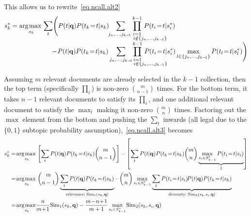 \documentclass[a4paper]{article}
\renewcommand{\vec}[1]{\mathbf{#1}}
\newcommand{\Sim}{\mathrm{Sim}}
\def\argmax{\operatornamewithlimits{\!arg \;\! max\,}}
\begin{document}
This allows us to rewrite~\eqref{eq.ncall.alt2}
\begin{align}
 & s_k^* = \, \argmax_{s_k} \sum_t \Biggl( P(t|\vec{q}) P(t_k\!=\!t|s_k)  \sum_{\hspace{-1mm} j_n, \dots, j_{k-\!1}} \hspace{-13.5mm} \prod_{\substack{i=1 \\ \hspace{14mm} i \notin \{j_n, \dots, j_{k-\!1}\}}}^{k-1} \hspace{-13mm} P(t_i\!=\!t|s_i^*) \nonumber \\[-1.5mm]
 & \hspace{25mm} - \!P(t|\vec{q}) P(t_k\!=\!t|s_k) \sum_{j_n, \dots, j_{k-\!1}} \hspace{-14mm} \prod_{\substack{i=1 \\ \hspace{14mm} i \notin \{j_n, \dots, j_{k-\!1}\}}}^{k-1} \hspace{-13mm} P(t_i\!=\!t|s_i^*) \max_{l \in \{j_n, \dots, j_{k-\!1}\}} P(t_l\!=\!t|s_l^*) \Biggr) \label{eq.ncall.alt3}
\end{align}

Assuming $m$ relevant documents are already selected in the $k-1$ collection, then the top term (specifically $\prod_i$) is non-zero $\binom{m}{n-1}$ times.  For the
bottom term, it takes $n-1$ relevant documents to satisfy its
$\prod_i$, and one additional relevant document to satisfy the
$\max_l$ making it non-zero $\binom{m}{n}$ times.  Factoring out the
$\max$ element from the bottom and pushing the $\sum_t$ inwards (all legal
due to the $\{0,1\}$ subtopic probability assumption),~\eqref{eq.ncall.alt3} becomes
\begin{align}
 s_k^* & = \argmax_{s_k} \left[ \sum_t P(t|\vec{q}) P(t_k\!=\!t|s_k) \binom{m}{n-1} \right]
 - \left[ \sum_t P(t|\vec{q}) P(t_k\!=\!t|s_k) \binom{m}{n} \underbrace{\max_{s_i \in S_{k-1}^*} P(t_i\!=\!t|s_i)}_{1} \right] \nonumber\\
 & = \argmax_{s_k} \binom{m}{n-1} \underbrace{\sum_t P(t|\vec{q}) P(t_k\!=\!t|s_k)}_{\textrm{relevance}: \; \Sim_1(s_k,\vec{q})}
 - \binom{m}{n} \max_{s_i \in S_{k-1}^*} \underbrace{\sum_t P(t_i\!=\!t|s_i) \!P(t|\vec{q}) P(t_k\!=\!t|s_k)}_{\textrm{diversity}: \; \Sim_2(s_k,s_i,\vec{q})} \label{note9}\\
 & = \argmax_{s_k} \!\! \frac{n}{m\!+\!1} \Sim_1(s_k,\vec{q}) - \frac{m\!-\!n\!+\!1}{m+1} \max_{s_i \in S_{k-1}^*} \! \Sim_2(s_k,s_i,\vec{q}) \label{note10}
\end{align}  
\end{document}
